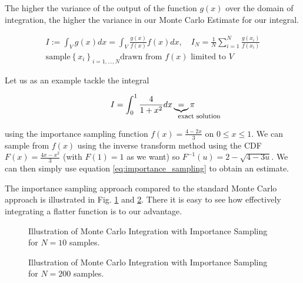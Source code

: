 The higher the variance of the output of the function $g(x)$ over the domain of integration, the higher
the variance in our Monte Carlo Estimate for our integral. 

\begin{equation}
    \begin{multlined}
        I := \int_{V} g(x) dx = \int_{V} \frac{g(x)}{f(x)} f(x) dx, \quad I_N = \frac{1}{N} \sum_{i=1}^{N} \frac{g(x_i)}{f(x_i)} \\
        \text{sample} \left\{x_i\right\}_{i=1,...,N} \text{drawn from } f(x) \text{ limited to } V
    \end{multlined}
    \label{eq:importance_sampling}
\end{equation}

Let us as an example tackle the integral

\begin{equation}
    I = \int_{0}^{1} \frac{4}{1+x^2} dx \explain{=}{\text{exact solution}} \pi
\end{equation}

using the importance sampling function $f(x) = \frac{4 - 2x}{3}$ on $0 \leq x \leq 1$. We can sample
from $f(x)$ using the inverse transform method using the CDF $F(x) = \frac{4x - x^2}{3}$ (with $F(1) = 1$ as we want) so $F^{-1}(u) = 2 - \sqrt{4 - 3u}$. We can then
simply use equation \ref{eq:importance_sampling} to obtain an estimate.

The importance sampling approach compared to the standard Monte Carlo approach is illustrated in Fig. \ref{fig:mc_impA} and \ref{fig:mc_impB}. There it is easy to see how
effectively integrating a flatter function is to our advantage.


\begin{figure}[!htb]
    \centering
    \hfill
    \caption{Illustration of Monte Carlo Integration with Importance Sampling for $N=10$ samples.}
    \label{fig:mc_impA}
\end{figure}

\begin{figure}[!htb]
    \centering
    \hfill
    \caption{Illustration of Monte Carlo Integration with Importance Sampling for $N=200$ samples.}
    \label{fig:mc_impB}
\end{figure}